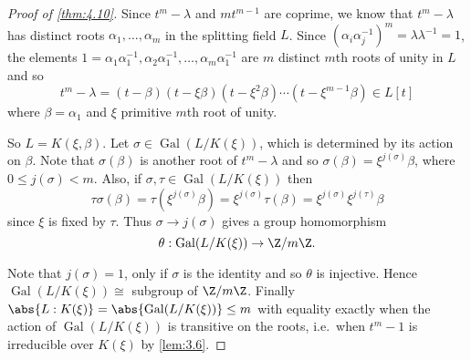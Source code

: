 \documentclass{article}
\DeclareMathOperator{\Gal}{Gal}
\begin{document}
\begin{proof}[Proof of \cref{thm:4.10}]
    Since $t^m - \lambda$ and $m t^{m-1}$ are coprime, we know that $t^m - \lambda$ has distinct roots $\alpha_1, \dotsc, \alpha_m$ in the splitting field $L$.
    Since $(\alpha_i \alpha_j^{-1})^m = \lambda \lambda^{-1} = 1$, the elements $1 = \alpha_1 \alpha_1^{-1}, \alpha_2 \alpha_1^{-1}, \dotsc, \alpha_m \alpha_1^{-1}$ are $m$ distinct $m$th roots of unity in $L$ and so
    \begin{equation*}
        t^m - \lambda = (t-\beta)(t-\xi\beta)(t-\xi^2 \beta)\dotsm (t-\xi^{m-1}\beta) \in L[t]
    \end{equation*}
    where $\beta = \alpha_1$ and $\xi$ primitive $m$th root of unity.

    So $L = K(\xi, \beta)$. Let $\sigma \in \Gal(L/K(\xi))$, which is determined by its action on $\beta$.
    Note that $\sigma(\beta)$ is another root of $t^m - \lambda$ and so $\sigma(\beta) = \xi^{j(\sigma)} \beta$, where $0 \leq j(\sigma) < m$.
    Also, if $\sigma, \tau \in \Gal(L/K(\xi))$ then
    \begin{equation*}
        \tau\sigma(\beta) = \tau(\xi^{j(\sigma)} \beta) = \xi^{j(\sigma)} \tau(\beta) = \xi^{j(\sigma)} \xi^{j(\tau)} \beta
    \end{equation*}
    since $\xi$ is fixed by $\tau$.
    Thus $\sigma \to j(\sigma)$ gives a group homomorphism
    \begin{equation*}
        \theta:\Gal(L/K(\xi)) \to \Z/m\Z.
    \end{equation*}

    Note that $j(\sigma) = 1$, only if $\sigma$ is the identity and so $\theta$ is injective.
    Hence $\Gal(L/K(\xi)) \cong $ subgroup of $\Z/m\Z$.
    Finally $\abs{L:K(\xi)} = \abs{\Gal(L/K(\xi))} \leq m$ with equality exactly when the action of $\Gal(L/K(\xi))$ is transitive on the roots, i.e.\ when $t^m-1$ is irreducible over $K(\xi)$ by \cref{lem:3.6}.
\end{proof}
\end{document}
